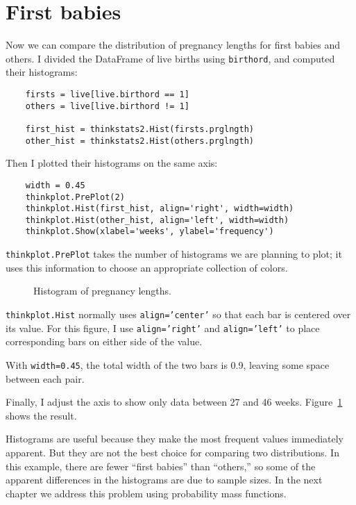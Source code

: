 \section{First babies}

Now we can compare the distribution of pregnancy lengths for first
babies and others.  I divided the DataFrame of live births using
{\tt birthord}, and computed their histograms:

\begin{verbatim}
    firsts = live[live.birthord == 1]
    others = live[live.birthord != 1]

    first_hist = thinkstats2.Hist(firsts.prglngth)
    other_hist = thinkstats2.Hist(others.prglngth)
\end{verbatim}

Then I plotted their histograms on the same axis:

\begin{verbatim}
    width = 0.45
    thinkplot.PrePlot(2)
    thinkplot.Hist(first_hist, align='right', width=width)
    thinkplot.Hist(other_hist, align='left', width=width)
    thinkplot.Show(xlabel='weeks', ylabel='frequency')
\end{verbatim}

{\tt thinkplot.PrePlot} takes the number of histograms
we are planning to plot; it uses this information to choose
an appropriate collection of colors.

\begin{figure}
\caption{Histogram of pregnancy lengths.}
\label{first_nsfg_hist}
\end{figure}

{\tt thinkplot.Hist} normally uses {\tt align='center'} so that
each bar is centered over its value.  For this figure, I use
{\tt align='right'} and {\tt align='left'} to place
corresponding bars on either side of the value.

With {\tt width=0.45}, the total width of the two bars is 0.9,
leaving some space between each pair.

Finally, I adjust the axis to show only data between 27 and 46 weeks.
Figure~\ref{first_nsfg_hist} shows the result.

Histograms are useful because they make the most frequent values
immediately apparent.  But they are not the best choice for comparing
two distributions.  In this example, there are fewer ``first babies''
than ``others,'' so some of the apparent differences in the histograms
are due to sample sizes.  In the next chapter we address this problem
using probability mass functions.


